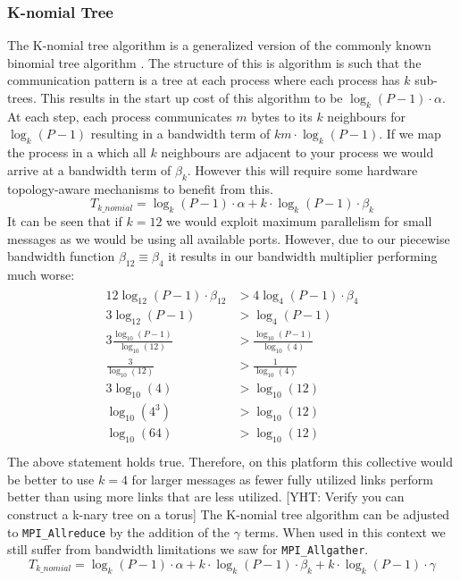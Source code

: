 \documentclass{article}
\newcommand{\yht}[1]{{\color{red}[YHT: #1]}}
\begin{document}
  \subsubsection{K-nomial Tree}
  The K-nomial tree algorithm is a generalized version of
  the commonly known binomial tree algorithm \cite{Wilkins2023Generalized}.
  The structure of this is algorithm is such that the communication pattern
  is a tree at each process where each process has $k$ sub-trees.
  This results in the start up cost of this algorithm to be $\log_k(P - 1)\cdot\alpha$.
  At each step,
  each process communicates $m$ bytes to its $k$ neighbours for $\log_k(P - 1)$ resulting in a bandwidth term of
  $k m \cdot \log_k(P - 1)$.
  If we map the process in a which all $k$ neighbours are adjacent to your process we would arrive
  at a bandwidth term of $\beta_k$.
  However this will require some hardware topology-aware mechanisms to benefit from this.
  \begin{equation}
    \label{eqn:k-nomial}
    T_{k\_nomial} = \log_k(P - 1) \cdot \alpha + k \cdot \log_k(P - 1) \cdot \beta_k
  \end{equation}
  It can be seen that if $k=12$ we would exploit maximum parallelism for small messages as
  we would be using all available ports.
  However,
  due to our piecewise bandwidth function $\beta_{12} \equiv \beta_4$
  it results in our bandwidth multiplier performing much worse:
  \begin{align}
  \begin{split}
    12 \log_{12}(P - 1) \cdot \beta_{12} &> 4 \log_4(P - 1) \cdot \beta_4 \\
    3 \log_{12}(P - 1) &> \log_4(P - 1) \\
    3 \frac{\log_{10}(P - 1)}{\log_{10}(12)} &> \frac{\log_{10}(P - 1)}{\log_{10}(4)} \\
    \frac{3}{\log_{10}(12)} &> \frac{1}{\log_{10}(4)} \\
    3\log_{10}(4) &> \log_{10}(12) \\
    \log_{10}(4^3) &> \log_{10}(12) \\
    \log_{10}(64) &> \log_{10}(12) \\
  \end{split}
  \end{align}
  \noindent
  The above statement holds true.
  Therefore,
  on this platform this collective would be better to use $k=4$ for larger
  messages as fewer fully utilized links perform better than using more links that are less utilized.
  \yht{Verify you can construct a k-nary tree on a torus}
  The K-nomial tree algorithm can be adjusted to \texttt{MPI\_Allreduce}
  by the addition of the $\gamma$ terms.
  When used in this context we still suffer from bandwidth limitations we saw for
  \texttt{MPI\_Allgather}.
  \begin{equation}
    \label{eqn:k-nomial}
    T_{k\_nomial} = \log_k(P - 1) \cdot \alpha
                  + k \cdot \log_k(P - 1) \cdot \beta_k
                  + k \cdot \log_k(P - 1) \cdot \gamma
  \end{equation}
\end{document}
